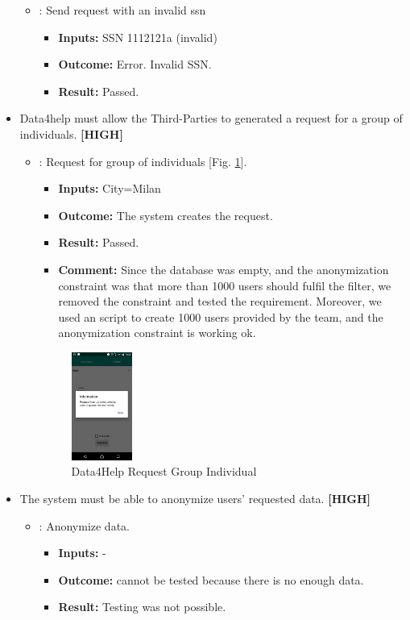 \documentclass[a4paper, hidelinks, 12pt]{report}
\newcommand\requirement[1]{\item[{[REQ-#1]}] }
\newcommand\test[1]{\item[{[TEST-#1]}] }
\begin{document}
\begin{itemize}
\begin{itemize}
		\test{8} : Send request with an invalid ssn
			\begin{itemize}
			\item \textbf{Inputs: } SSN 1112121a (invalid)
			\item \textbf{Outcome: } Error. Invalid SSN.
			\item \textbf{Result: } Passed. 
			 \end{itemize}	
	\end{itemize}
	
	\requirement{10} Data4help must allow the Third-Parties to generated a request for a group of individuals.  \textbf{[HIGH]}
	
						\begin{itemize}
		\test{9}: Request for group of individuals [Fig. \ref{fig:request_group_individuals}].
			\begin{itemize}
			\item \textbf{Inputs: } City=Milan	
			\item \textbf{Outcome: } The system creates the request.
			\item \textbf{Result: } Passed.
			\item \textbf{Comment: } Since the database was empty, and the anonymization constraint was that more than 1000 users should fulfil the filter, we removed the constraint and tested the requirement. Moreover, we used an script to create 1000 users provided by the team, and the anonymization constraint is working ok.  
			\end{itemize}
			\begin{figure}[H]
					\centering
				\includegraphics[width=0.2\textwidth]{images/request_group_individuals.jpeg}
					\caption[Data4Help Request Group Individual]{Data4Help Request Group Individual}
				\label{fig:request_group_individuals}
			\end{figure}

	\end{itemize}
	
	\requirement{11} The system must be able to anonymize users’ requested data. \textbf{[HIGH]}
	\begin{itemize}
		\test{10}: Anonymize data.
			\begin{itemize}
			\item \textbf{Inputs: } -			
			\item \textbf{Outcome: } cannot be tested because there is no enough data.
			\item \textbf{Result: } Testing was not possible. 
			\end{itemize}	
	\end{itemize}
	

\end{itemize}
\end{document}

